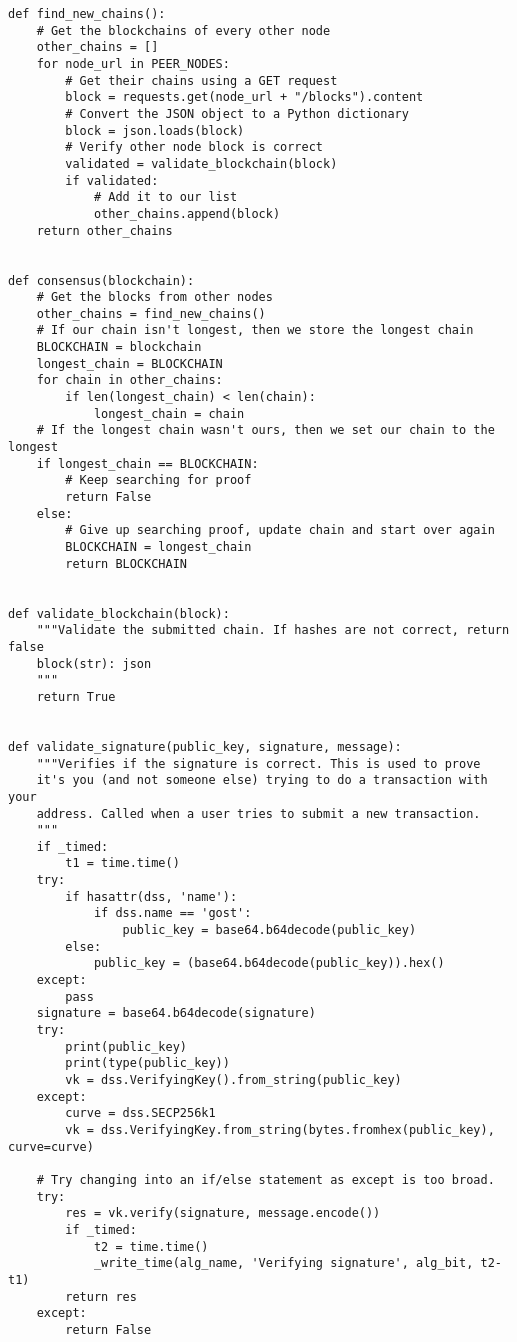\begin{lstlisting}
def find_new_chains():
    # Get the blockchains of every other node
    other_chains = []
    for node_url in PEER_NODES:
        # Get their chains using a GET request
        block = requests.get(node_url + "/blocks").content
        # Convert the JSON object to a Python dictionary
        block = json.loads(block)
        # Verify other node block is correct
        validated = validate_blockchain(block)
        if validated:
            # Add it to our list
            other_chains.append(block)
    return other_chains


def consensus(blockchain):
    # Get the blocks from other nodes
    other_chains = find_new_chains()
    # If our chain isn't longest, then we store the longest chain
    BLOCKCHAIN = blockchain
    longest_chain = BLOCKCHAIN
    for chain in other_chains:
        if len(longest_chain) < len(chain):
            longest_chain = chain
    # If the longest chain wasn't ours, then we set our chain to the longest
    if longest_chain == BLOCKCHAIN:
        # Keep searching for proof
        return False
    else:
        # Give up searching proof, update chain and start over again
        BLOCKCHAIN = longest_chain
        return BLOCKCHAIN


def validate_blockchain(block):
    """Validate the submitted chain. If hashes are not correct, return false
    block(str): json
    """
    return True


def validate_signature(public_key, signature, message):
    """Verifies if the signature is correct. This is used to prove
    it's you (and not someone else) trying to do a transaction with your
    address. Called when a user tries to submit a new transaction.
    """
    if _timed:
        t1 = time.time()
    try:
        if hasattr(dss, 'name'):
            if dss.name == 'gost':
                public_key = base64.b64decode(public_key)
        else:
            public_key = (base64.b64decode(public_key)).hex()
    except:
        pass
    signature = base64.b64decode(signature)
    try:
        print(public_key)
        print(type(public_key))
        vk = dss.VerifyingKey().from_string(public_key)
    except:
        curve = dss.SECP256k1
        vk = dss.VerifyingKey.from_string(bytes.fromhex(public_key), curve=curve)

    # Try changing into an if/else statement as except is too broad.
    try:
        res = vk.verify(signature, message.encode())
        if _timed:
            t2 = time.time()
            _write_time(alg_name, 'Verifying signature', alg_bit, t2-t1)
        return res
    except:
        return False



\end{lstlisting}
